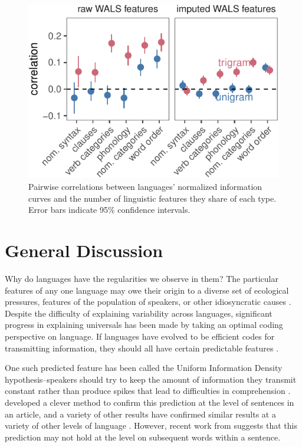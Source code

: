 \documentclass[entropy,article,submit,moreauthors,pdftex]{mdpi}
\begin{document}
\begin{figure}[tb]

{\centering \includegraphics{figs/type-cors-1} 

}

\caption{Pairwise correlations between languages' normalized information curves and the number of linguistic features they share of each type. Error bars indicate 95\% confidence intervals.}\label{fig:type-cors}
\end{figure}

\hypertarget{general-discussion}{%
\section{General Discussion}\label{general-discussion}}

Why do languages have the regularities we observe in them? The
particular features of any one language may owe their origin to a
diverse set of ecological pressures, features of the population of
speakers, or other idiosyncratic causes
\citep{maddieson2015, lupyan2010}. Despite the difficulty of explaining
variability across languages, significant progress in explaining
universals has been made by taking an optimal coding perspective on
language. If languages have evolved to be efficient codes for
transmitting information, they should all have certain predictable
features \citep{anderson1989, shannon1948}.

One such predicted feature has been called the Uniform Information
Density hypothesis--speakers should try to keep the amount of
information they transmit constant rather than produce spikes that lead
to difficulties in comprehension
\citep{aylett2004, genzel2002, levy2007}. \citet{genzel2002} developed a
clever method to confirm this prediction at the level of sentences in an
article, and a variety of other results have confirmed similar results
at a variety of other levels of language
\citep[e.g.][]{jaeger2010, van-son2005}. However, recent work from
\citet{yu2016} suggests that this prediction may not hold at the level
on subsequent words within a sentence.
\end{document}
